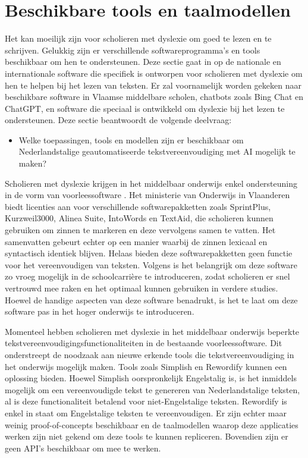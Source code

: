 \section{Beschikbare tools en taalmodellen}
\label{sec:beschikbare-tools-en-taalmodellen}

Het kan moeilijk zijn voor scholieren met dyslexie om goed te lezen en te schrijven. Gelukkig zijn er verschillende softwareprogramma's en tools beschikbaar om hen te ondersteunen. Deze sectie gaat in op de nationale en internationale software die specifiek is ontworpen voor scholieren met dyslexie om hen te helpen bij het lezen van teksten.  Er zal voornamelijk worden gekeken naar beschikbare software in Vlaamse middelbare scholen, chatbots zoals Bing Chat en ChatGPT, en software die speciaal is ontwikkeld om dyslexie bij het lezen te ondersteunen. Deze sectie beantwoordt de volgende deelvraag: 

\begin{itemize}
	\item Welke toepassingen, tools en modellen zijn er beschikbaar om Nederlandstalige geautomatiseerde tekstvereenvoudiging met AI mogelijk te maken?
\end{itemize}

\medspace

Scholieren met dyslexie krijgen in het middelbaar onderwijs enkel ondersteuning in de vorm van voorleessoftware \autocite{DeCraemer2018, OnderwijsVlaanderen2023}. Het ministerie van Onderwijs in Vlaanderen biedt licenties aan voor verschillende softwarepakketten zoals SprintPlus, Kurzweil3000, Alinea Suite, IntoWords en TextAid, die scholieren kunnen gebruiken om zinnen te markeren en deze vervolgens samen te vatten. Het samenvatten gebeurt echter op een manier waarbij de zinnen lexicaal en syntactisch identiek blijven. Helaas bieden deze softwarepakketten geen functie voor het vereenvoudigen van teksten. Volgens \textcite{Tops2018} is het belangrijk om deze software zo vroeg mogelijk in de schoolcarrière te introduceren, zodat scholieren er snel vertrouwd mee raken en het optimaal kunnen gebruiken in verdere studies. Hoewel \textcite{Tops2018} de handige aspecten van deze software benadrukt, is het te laat om deze software pas in het hoger onderwijs te introduceren.

\medspace

Momenteel hebben scholieren met dyslexie in het middelbaar onderwijs beperkte tekstvereenvoudigingsfunctionaliteiten in de bestaande voorleessoftware. Dit onderstreept de noodzaak aan nieuwe erkende tools die tekstvereenvoudiging in het onderwijs mogelijk maken. Tools zoals Simplish en Rewordify kunnen een oplossing bieden. Hoewel Simplish oorspronkelijk Engelstalig is, is het inmiddels mogelijk om een vereenvoudigde tekst te genereren van Nederlandstalige teksten, al is deze functionaliteit betalend voor niet-Engelstalige teksten. Rewordify is enkel in staat om Engelstalige teksten te vereenvoudigen. Er zijn echter maar weinig proof-of-concepts beschikbaar en de taalmodellen waarop deze applicaties werken zijn niet gekend om deze tools te kunnen repliceren. Bovendien zijn er geen API's beschikbaar om mee te werken. 

